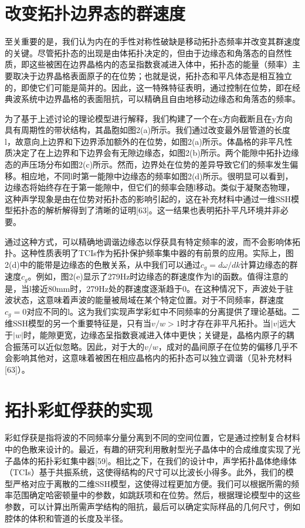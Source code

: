 \section{改变拓扑边界态的群速度}

至关重要的是，我们认为内在的手性对称性破缺是移动拓扑态频率并改变其群速度的关键。尽管拓扑态的出现是由体拓扑决定的，但由于边缘态和角落态的自然性质，即这些被困在边界晶格内的态呈指数衰减进入体中，拓扑态的能量（频率）主要取决于边界晶格表面原子的在位势；也就是说，拓扑态和平凡体态是相互独立的，即使它们可能是简并的。因此，这一特殊特征表明，通过控制在位势，即在经典波系统中边界晶格的表面阻抗，可以精确且自由地移动边缘态和角落态的频率。

为了基于上述讨论的理论模型进行解释，我们构建了一个在x方向截断且在y方向具有周期性的带状结构，其晶胞如图2(a)所示。我们通过改变最外层管道的长度l，故意向上边界和下边界添加额外的在位势，如图2(a)所示。体晶格的非平凡性质决定了在上边界和下边界会有无隙边缘态，如图2(b)所示。两个能隙中拓扑边缘态的声压场分布如图2(c)所示。然而，边界处在位势的差异导致它们的频率发生偏移。相应地，不同l时第一能隙中边缘态的频率如图2(d)所示。很明显可以看到，边缘态将始终存在于第一能隙中，但它们的频率会随l移动。类似于凝聚态物理，这种声学现象是由在位势对拓扑态的影响引起的，这在补充材料中通过一维SSH模型拓扑态的解析解得到了清晰的证明[63]。这一结果也表明拓扑平凡环境并非必要。

通过这种方式，可以精确地调谐边缘态以俘获具有特定频率的波，而不会影响体拓扑。这种性质表明了TCIs作为拓扑保护频率集中器的有前景的应用。实际上，图2(d)中的能带是边缘态的色散关系，从中我们可以通过$c_g = d\omega/dk$计算边缘态的群速度$c_g$。例如，图2(e)显示了279Hz时边缘态的群速度作为l的函数。值得注意的是，当l接近80mm时，279Hz处的群速度逐渐趋于0。在这种情况下，声波处于驻波状态，这意味着声波的能量被局域在某个特定位置。对于不同频率，群速度$c_g = 0$对应不同的l。这为我们实现声学彩虹中不同频率的分离提供了理论基础。二维SSH模型的另一个重要特征是，只有当$v/w > 1$时才存在非平凡拓扑。当$|v|$远大于$|w|$时，能隙更宽，边缘态呈指数衰减进入体中更快；关键是，晶格内原子的耦合振荡可以近似忽略。因此，对于大的$v/w$，成对的晶间原子在位势的偏移几乎不会影响其他对，这意味着被困在相应晶格内的拓扑态可以独立调谐（见补充材料[63]）。

\section{拓扑彩虹俘获的实现}
彩虹俘获是指将波的不同频率分量分离到不同的空间位置，它是通过控制复合材料中的色散来设计的。最近，有趣的研究利用散射型光子晶体中的合成维度实现了光子晶体的拓扑彩虹集中器[59]。相比之下，在我们的设计中，声学拓扑晶体绝缘体（TCIs）基于共振系统，这使得结构的尺寸可以比波长小得多。此外，我们的模型严格对应于离散的二维SSH模型，这使得过程更加方便。我们可以根据所需的频率范围确定哈密顿量中的参数，如跳跃项和在位势。然后，根据理论模型中的这些参数，可以计算出所需声学结构的阻抗，最后可以确定实际样品的几何尺寸，例如腔体的体积和管道的长度及半径。


